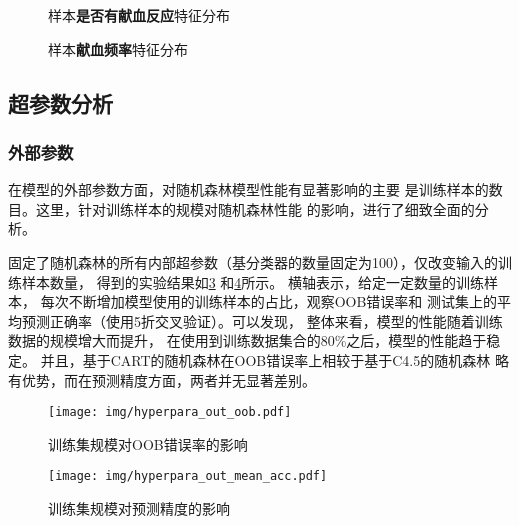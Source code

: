 \documentclass[main.tex]{subfiles}
\begin{document}
\begin{figure}[htbp!]
    \centering 
    \caption{样本\textbf{是否有献血反应}特征分布}
    \label{reaction_dis}
\end{figure}

\begin{figure}[htbp!]
    \centering 
    \caption{样本\textbf{献血频率}特征分布}
    \label{frequency_dis}
\end{figure}

\subsection{超参数分析}
\subsubsection{外部参数}
在模型的外部参数方面，对随机森林模型性能有显著影响的主要
是训练样本的数目。这里，针对训练样本的规模对随机森林性能
的影响，进行了细致全面的分析。

固定了随机森林的所有内部超参数（基分类器的数量固定为100），仅改变输入的训练样本数量，
得到的实验结果如\ref{hyper_training_data_oob}
和\ref{hyper_training_data_acc}所示。
横轴表示，给定一定数量的训练样本，
每次不断增加模型使用的训练样本的占比，观察OOB错误率和
测试集上的平均预测正确率（使用5折交叉验证）。可以发现，
整体来看，模型的性能随着训练数据的规模增大而提升，
在使用到训练数据集合的80\%之后，模型的性能趋于稳定。
并且，基于CART的随机森林在OOB错误率上相较于基于C4.5的随机森林
略有优势，而在预测精度方面，两者并无显著差别。

\begin{figure}[htbp!]
    \centering \texttt{[image: img/hyperpara\_out\_oob.pdf]} 
    \caption{训练集规模对OOB错误率的影响}
    \label{hyper_training_data_oob}
\end{figure}


\begin{figure}[htbp!]
    \centering \texttt{[image: img/hyperpara\_out\_mean\_acc.pdf]} 
    \caption{训练集规模对预测精度的影响}
    \label{hyper_training_data_acc}
\end{figure}
\end{document}
